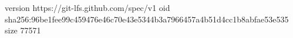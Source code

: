 version https://git-lfs.github.com/spec/v1
oid sha256:96be1fee99c459476e46c70e43e5344b3a7966457a4b51d4cc1b8abfae53e535
size 77571

